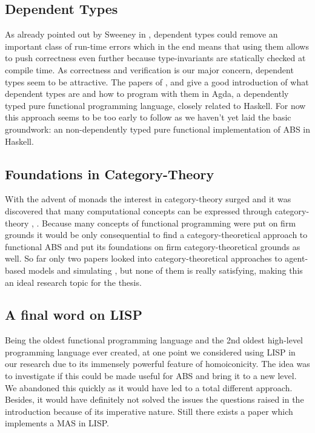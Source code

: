 \subsection{Dependent Types}
As already pointed out by Sweeney in \cite{sweeney_next_2006}, dependent types could remove an important class of run-time errors which in the end means that using them allows to push correctness even further because type-invariants are statically checked at compile time. As correctness and verification is our major concern, dependent types seem to be attractive. The papers of \cite{norell_dependently_2009}, \cite{bove_brief_2009} and \cite{bove_dependent_2009} give a good introduction of what dependent types are and how to program with them in Agda, a dependently typed pure functional programming language, closely related to Haskell. For now this approach seems to be too early to follow as we haven't yet laid the basic groundwork: an non-dependently typed pure functional implementation of ABS in Haskell.

\subsection{Foundations in Category-Theory}
With the advent of monads the interest in category-theory surged and it was discovered that many computational concepts can be expressed through category-theory \cite{pierce_basic_1991}, \cite{spivak_category_2014}. Because many concepts of functional programming were put on firm grounds it would be only consequential to find a category-theoretical approach to functional ABS and put its foundations on firm category-theoretical grounds as well. So far only two papers looked into category-theoretical approaches to agent-based models and simulating \cite{beheshti_analyzing_2013}, \cite{lloyd_category-theoretic_2010} but none of them is really satisfying, making this an ideal research topic for the thesis.


\subsection{A final word on LISP}
Being the oldest functional programming language and the 2nd oldest high-level programming language ever created, at one point we considered using LISP in our research due to its immensely powerful feature of homoiconicity. The idea was to investigate if this could be made useful for ABS and bring it to a new level. We abandoned this quickly as it would have led to a total different approach. Besides, it would have definitely not solved the issues the questions raised in the introduction because of its imperative nature. Still there exists a paper \cite{kawabe_nepi2programming_2000} which implements a MAS in LISP.